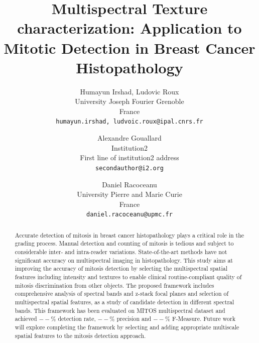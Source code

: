 \documentclass[10pt,twocolumn,letterpaper]{article}
\begin{document}
\title{Multispectral Texture characterization: Application to Mitotic Detection in Breast Cancer Histopathology}

\author{Humayun Irshad, Ludovic Roux\\
	University Joseph Fourier Grenoble \\ France\\
	{\tt\small {humayun.irshad, ludvoic.roux}@ipal.cnrs.fr} \\
	\and 
	Alexandre Gouallard\\
	Institution2\\ First line of institution2 address\\
	{\tt\small secondauthor@i2.org} \\
	\and
	Daniel Racoceanu\\
	University Pierre and Marie Curie \\ France\\
	{\tt\small daniel.racoceanu@upmc.fr}
}

\maketitle

\begin{abstract}
Accurate detection of mitosis in breast cancer histopathology plays a critical role in the grading process. Manual detection and counting of mitosis is tedious and subject to considerable inter- and intra-reader variations. State-of-the-art methods have not significant accuracy on multispectral imaging in histopathology. This study aims at improving the accuracy of mitosis detection by selecting the multispectral spatial features including intensity and textures to enable clinical routine-compliant quality of mitosis discrimination from other objects. The proposed framework includes comprehensive analysis of spectral bands and z-stack focal planes and selection of multispectral spatial features, as a study of candidate detection in different spectral bands. This framework has been evaluated on MITOS multispectral dataset and achieved $--\%$ detection rate, $--\%$ precision and $--\%$ F-Measure. Future work will explore completing the framework by selecting and adding appropriate multiscale spatial features to the mitosis detection approach.
\end{abstract}
\end{document}
